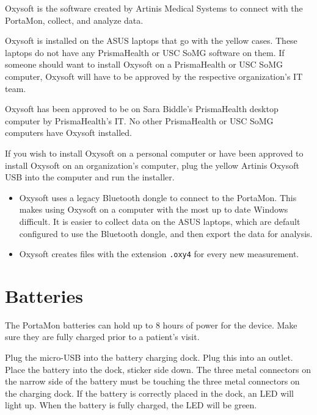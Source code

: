 \documentclass[
]{book}
\begin{document}
Oxysoft is the software created by Artinis Medical Systems to connect with the PortaMon, collect, and analyze data.

Oxysoft is installed on the ASUS laptops that go with the yellow cases. These laptops do not have any PrismaHealth or USC SoMG software on them. If someone should want to install Oxysoft on a PrismaHealth or USC SoMG computer, Oxysoft will have to be approved by the respective organization's IT team.

Oxysoft has been approved to be on Sara Biddle's PrismaHealth desktop computer by PrismaHealth's IT. No other PrismaHealth or USC SoMG computers have Oxysoft installed.

If you wish to install Oxysoft on a personal computer or have been approved to install Oxysoft on an organization's computer, plug the yellow Artinis Oxysoft USB into the computer and run the installer.

\begin{itemize}
\item
  Oxysoft uses a legacy Bluetooth dongle to connect to the PortaMon. This makes using Oxysoft on a computer with the most up to date Windows difficult. It is easier to collect data on the ASUS laptops, which are default configured to use the Bluetooth dongle, and then export the data for analysis.
\item
  Oxysoft creates files with the extension \texttt{.oxy4} for every new measurement.
\end{itemize}

\hypertarget{PortaMon-Batteries}{%
\section{Batteries}\label{PortaMon-Batteries}}

The PortaMon batteries can hold up to 8 hours of power for the device. Make sure they are fully charged prior to a patient's visit.

Plug the micro-USB into the battery charging dock. Plug this into an outlet. Place the battery into the dock, sticker side down. The three metal connectors on the narrow side of the battery must be touching the three metal connectors on the charging dock. If the battery is correctly placed in the dock, an LED will light up. When the battery is fully charged, the LED will be green.
\end{document}

